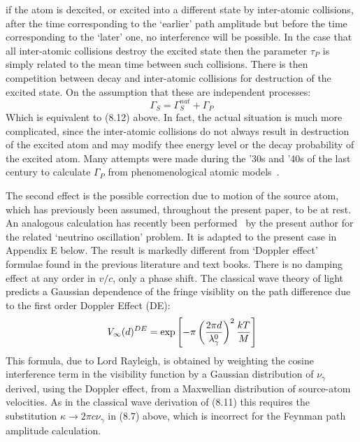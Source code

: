 {    if the atom is dexcited, or excited into a different state by inter-atomic collisions, after the time
    corresponding to the `earlier'  path amplitude but before the time corresponding to the
    `later' one, no interference will be possible. In the case that all inter-atomic collisions
     destroy the excited state then the parameter $\tau_P$ is simply related to the mean time
   between such collisions. There is then competition between decay and inter-atomic collisions
   for destruction of the excited state. On the assumption that these are independent processes:
      \begin{equation}
       \Gamma_S  =   \Gamma_S^{nat} +   \Gamma_P 
     \end{equation}
    Which is equivalent to (8.12) above. In fact, the actual situation is much more complicated, since the
    inter-atomic collisions do not always result in destruction of the excited atom and may modify thee
    energy level or the decay probability of the excited atom.
     Many attempts were made during the '30s and '40s of the last century to calculate $\Gamma_P$
     from phenomenological atomic models~\cite{Linewidth,Lineshape}.

    \par The second effect is the possible correction due to motion of the source atom, 
    which has previously been assumed, throughout the present paper,
     to be at rest. An analogous calculation has recently been performed~\cite{JHF2} by the present
    author for the related `neutrino oscillation' problem. It is adapted to the present case in 
     Appendix E below. The result is markedly different from `Doppler effect' formulae found in 
     the previous literature and text books. There is no damping effect at any order in $v/c$, 
    only a phase shift.
     The classical wave theory of light predicts a Gaussian dependence of the fringe visiblity
     on the path difference due to the first order Doppler Effect (DE):
      \begin{equation}
       {\it V}_{\infty}(d)^{DE} = \exp \left[-\pi\left(\frac{2 \pi d}{\lambda_{\gamma}^0}\right)^2 \frac{kT}{M} \right]
      \end{equation}
       This formula, due to Lord Rayleigh, is obtained by weighting the cosine interference term in the visibility
      function by a Gaussian distribution of $\nu_{\gamma}$ derived, using the Doppler effect, from a Maxwellian
     distribution of source-atom velocities. As in the classical wave derivation of (8.11) this requires the
     substitution  $\kappa \rightarrow 2 \pi c \nu_{\gamma}$ in (8.7) above, which is incorrect for
    the Feynman path amplitude calculation.

}
